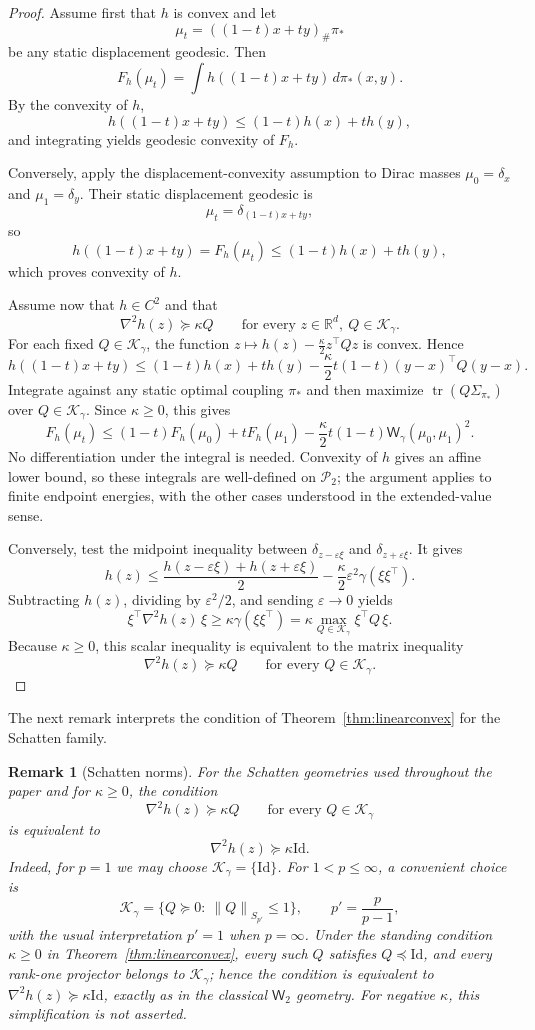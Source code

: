 \documentclass{article}
\newtheorem{remark}[theorem]{Remark}
\newcommand{\R}{\mathbb{R}}
\newcommand{\cP}{\mathcal{P}}
\newcommand{\Wtwo}{\mathsf{W}_2}
\newcommand{\Wg}{\mathsf{W}_{\gamma}}
\newcommand{\tr}{\operatorname{tr}}
\newcommand{\Id}{\mathrm{Id}}
\newcommand{\norm}[1]{\left\lVert #1 \right\rVert}
\newcommand{\cK}{\mathcal K_\gamma}
\begin{document}
\begin{proof}
Assume first that $h$ is convex and let
$$
\mu_t=((1-t)x+ty)_\#\pi_*
$$
be any static displacement geodesic. Then
$$
F_h(\mu_t)
=
\int h((1-t)x+ty)\,d\pi_*(x,y).
$$
By the convexity of $h$,
$$
h((1-t)x+ty)\le (1-t)h(x)+th(y),
$$
and integrating yields geodesic convexity of $F_h$.

Conversely, apply the displacement-convexity assumption to Dirac masses
$\mu_0=\delta_x$ and $\mu_1=\delta_y$. Their static displacement geodesic is
$$
\mu_t=\delta_{(1-t)x+ty},
$$
so
$$
h((1-t)x+ty)=F_h(\mu_t)\le (1-t)h(x)+th(y),
$$
which proves convexity of $h$.

Assume now that $h\in C^2$ and that
$$
\nabla^2 h(z)\succeq \kappa Q
\qquad
\text{for every }z\in\R^d,\ Q\in\cK.
$$
For each fixed $Q\in\cK$, the function
$z\mapsto h(z)-\frac{\kappa}{2}z^\top Qz$ is convex. Hence
\[
 h((1-t)x+ty)\le (1-t)h(x)+th(y)
 -\frac{\kappa}{2}t(1-t)(y-x)^\top Q(y-x).
\]
Integrate against any static optimal coupling $\pi_*$ and then maximize
$\tr(Q\Sigma_{\pi_*})$ over $Q\in\cK$. Since $\kappa\ge0$, this gives
\[
 F_h(\mu_t)\le (1-t)F_h(\mu_0)+tF_h(\mu_1)
 -\frac{\kappa}{2}t(1-t)\Wg(\mu_0,\mu_1)^2.
\]
No differentiation under the integral is needed. Convexity of $h$ gives an
affine lower bound, so these integrals are well-defined on $\cP_2$;
the argument applies to finite endpoint energies, with the other cases
understood in the extended-value sense.

Conversely, test the midpoint inequality between
$\delta_{z-\varepsilon\xi}$ and $\delta_{z+\varepsilon\xi}$. It gives
\[
 h(z)
 \le
 \frac{h(z-\varepsilon\xi)+h(z+\varepsilon\xi)}{2}
 -\frac{\kappa}{2}\varepsilon^2\gamma(\xi\xi^\top).
\]
Subtracting $h(z)$, dividing by $\varepsilon^2/2$, and sending
$\varepsilon\to0$ yields
$$
\xi^\top \nabla^2 h(z)\,\xi
\ge
\kappa\gamma(\xi\xi^\top)
=
\kappa\max_{Q\in\cK}\xi^\top Q\,\xi.
$$
Because $\kappa\ge0$, this scalar inequality is equivalent to the matrix inequality
$$
\nabla^2 h(z)\succeq \kappa Q
\qquad
\text{for every }Q\in\cK.
$$
\end{proof}

The next remark interprets the condition of Theorem~\ref{thm:linearconvex} for the Schatten family.
\begin{remark}[Schatten norms]
For the Schatten geometries used throughout the paper and for $\kappa\ge0$, the condition
$$
\nabla^2 h(z)\succeq \kappa Q
\qquad
\text{for every }Q\in\cK
$$
is equivalent to
$$
\nabla^2 h(z)\succeq \kappa \Id.
$$
Indeed, for $p=1$ we may choose $\cK=\{\Id\}$. For $1<p\le \infty$, a convenient choice is
$$
\cK=\{Q\succeq 0:\ \norm{Q}_{S_{p'}}\le 1\},
\qquad
p'=\frac{p}{p-1},
$$
with the usual interpretation $p'=1$ when $p=\infty$. Under the standing
condition $\kappa\ge0$ in Theorem~\ref{thm:linearconvex}, every such $Q$
satisfies $Q\preceq\Id$, and every rank-one projector belongs to $\cK$; hence
the condition is equivalent to $\nabla^2h(z)\succeq\kappa\Id$, exactly as in
the classical $\Wtwo$ geometry. For negative $\kappa$, this simplification is
not asserted.
\end{remark}
\end{document}
